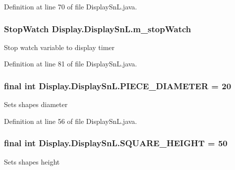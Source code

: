 Definition at line 70 of file Display\+Sn\+L.\+java.

\hypertarget{class_display_1_1_display_sn_l_a4e69018d83aaba48baa701597a876bf6}{}
\subsubsection[{m\+\_\+stop\+Watch}]{\setlength{\rightskip}{0pt plus 5cm}Stop\+Watch Display.\+Display\+Sn\+L.\+m\+\_\+stop\+Watch\hspace{0.3cm}{\ttfamily [private]}}\label{class_display_1_1_display_sn_l_a4e69018d83aaba48baa701597a876bf6}
Stop watch variable to display timer 

Definition at line 81 of file Display\+Sn\+L.\+java.

\hypertarget{class_display_1_1_display_sn_l_ac8f487404183209a60d90af4124eb61c}{}
\subsubsection[{P\+I\+E\+C\+E\+\_\+\+D\+I\+A\+M\+E\+T\+E\+R}]{\setlength{\rightskip}{0pt plus 5cm}final int Display.\+Display\+Sn\+L.\+P\+I\+E\+C\+E\+\_\+\+D\+I\+A\+M\+E\+T\+E\+R = 20\hspace{0.3cm}{\ttfamily [static]}}\label{class_display_1_1_display_sn_l_ac8f487404183209a60d90af4124eb61c}
Sets shape\textquotesingle{}s diameter 

Definition at line 56 of file Display\+Sn\+L.\+java.

\hypertarget{class_display_1_1_display_sn_l_abcf7150eb19d813f34a1cdd3708d5c83}{}
\subsubsection[{S\+Q\+U\+A\+R\+E\+\_\+\+H\+E\+I\+G\+H\+T}]{\setlength{\rightskip}{0pt plus 5cm}final int Display.\+Display\+Sn\+L.\+S\+Q\+U\+A\+R\+E\+\_\+\+H\+E\+I\+G\+H\+T = 50\hspace{0.3cm}{\ttfamily [static]}}\label{class_display_1_1_display_sn_l_abcf7150eb19d813f34a1cdd3708d5c83}
Sets shape\textquotesingle{}s height 

